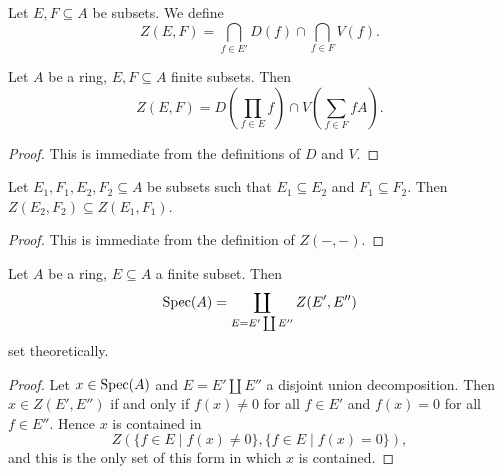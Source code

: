 \begin{definition}
    Let $E, F \subseteq A$ be subsets. We define
    \[
    Z(E, F) = \bigcap_{f \in E'} D(f) \cap \bigcap_{f \in F} V(f)
    .\]
    \label{def:subset-stratum}
    \leanok
\end{definition}

\begin{lemma}
    Let $A$ be a ring, $E, F \subseteq A$ finite subsets. Then
    \[
    Z(E, F) = D\left( \prod_{f \in E}  f \right) \cap V\left( \sum_{f \in F} fA \right)
    .\]
    \label{lemma:subset-stratum-equals-inter}
    \leanok
\end{lemma}

\begin{proof}
    \leanok
    This is immediate from the definitions of $D$ and $V$.
\end{proof}

\begin{lemma}
    Let $E_1, F_1, E_2, F_2 \subseteq A$ be subsets such that $E_1 \subseteq E_2$ and
    $F_1 \subseteq F_2$. Then $Z(E_2, F_2) \subseteq Z(E_1, F_1)$.
    \label{lemma:subset-stratum-mono}
    \leanok
\end{lemma}

\begin{proof}
    \leanok
    This is immediate from the definition of $Z(-, -)$.
\end{proof}

\begin{lemma}
    Let $A$ be a ring, $E \subseteq A$ a finite subset. Then
    \[
        \mathrm{Spec}(A) = \coprod_{E = E' \coprod E''} Z(E', E'')
    \] set theoretically.
    \label{lemma:subset-stratification}
    \leanok
\end{lemma}

\begin{proof}
    \leanok
    Let $x \in \mathrm{Spec}(A)$ and $E = E' \coprod E''$ a disjoint union decomposition. Then
    $x \in Z(E', E'')$ if and only if $f(x) \neq 0$ for all $f \in E'$ and $f(x) = 0$
    for all $f \in E''$. Hence $x$ is contained in
    \[
    Z(\{ f \in E  \mid f(x) \neq 0\}, \{f \in E  \mid f(x) = 0\})
    ,\] and this is the only set of this form in which $x$ is contained.
\end{proof}

